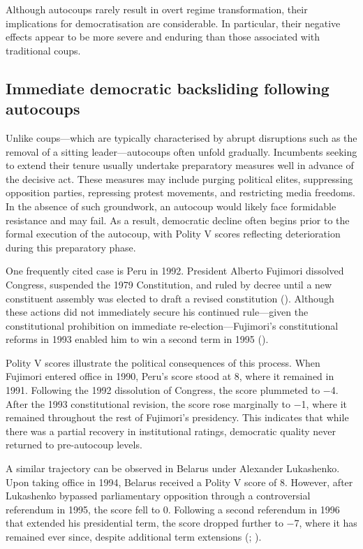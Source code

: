 \documentclass[
  12pt,
]{report}
\begin{document}
Although autocoups rarely result in overt regime transformation, their
implications for democratisation are considerable. In particular, their
negative effects appear to be more severe and enduring than those
associated with traditional coups.

\subsection*{Immediate democratic backsliding following
autocoups}\label{immediate-democratic-backsliding-following-autocoups}

Unlike coups---which are typically characterised by abrupt disruptions
such as the removal of a sitting leader---autocoups often unfold
gradually. Incumbents seeking to extend their tenure usually undertake
preparatory measures well in advance of the decisive act. These measures
may include purging political elites, suppressing opposition parties,
repressing protest movements, and restricting media freedoms. In the
absence of such groundwork, an autocoup would likely face formidable
resistance and may fail. As a result, democratic decline often begins
prior to the formal execution of the autocoup, with Polity V scores
reflecting deterioration during this preparatory phase.

One frequently cited case is Peru in 1992. President Alberto Fujimori
dissolved Congress, suspended the 1979 Constitution, and ruled by decree
until a new constituent assembly was elected to draft a revised
constitution ().
Although these actions did not immediately secure his continued
rule---given the constitutional prohibition on immediate
re-election---Fujimori's constitutional reforms in 1993 enabled him to
win a second term in 1995 ().

Polity V scores illustrate the political consequences of this process.
When Fujimori entered office in 1990, Peru's score stood at 8, where it
remained in 1991. Following the 1992 dissolution of Congress, the score
plummeted to −4. After the 1993 constitutional revision, the score rose
marginally to −1, where it remained throughout the rest of Fujimori's
presidency. This indicates that while there was a partial recovery in
institutional ratings, democratic quality never returned to pre-autocoup
levels.

A similar trajectory can be observed in Belarus under Alexander
Lukashenko. Upon taking office in 1994, Belarus received a Polity V
score of 8. However, after Lukashenko bypassed parliamentary opposition
through a controversial referendum in 1995, the score fell to 0.
Following a second referendum in 1996 that extended his presidential
term, the score dropped further to −7, where it has remained ever since,
despite additional term extensions (;
).
\end{document}
